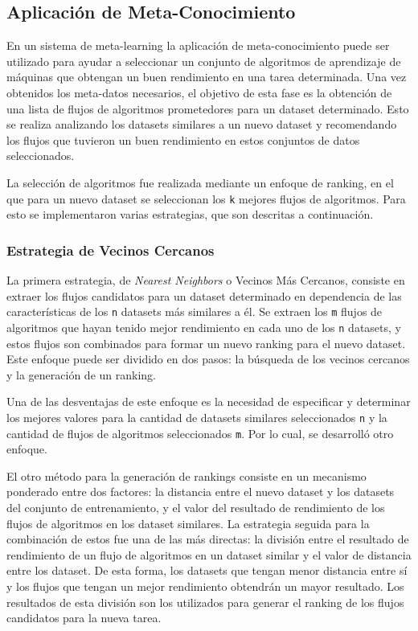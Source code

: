 \documentclass[a4paper,12pt]{article}
\begin{document}
	\subsection{Aplicación de Meta-Conocimiento}

En un sistema de meta-learning la aplicación de meta-conocimiento puede ser utilizado para ayudar a seleccionar un conjunto de algoritmos de aprendizaje de máquinas que obtengan un buen rendimiento en una tarea determinada. Una vez obtenidos los meta-datos necesarios, el objetivo de esta fase es la obtención de una lista de flujos de algoritmos prometedores para un dataset determinado. Esto se realiza analizando los datasets similares a un nuevo dataset y recomendando los flujos que tuvieron un buen rendimiento en estos conjuntos de datos seleccionados. 

La selección de algoritmos fue realizada mediante un enfoque de ranking, en el que para un nuevo dataset se seleccionan los \texttt{k} mejores flujos de algoritmos. Para esto se implementaron varias estrategias, que son descritas a continuación.

	\subsubsection{Estrategia de Vecinos Cercanos}\label{subsub:nn}
	
	La primera estrategia, de \textit{Nearest Neighbors} o Vecinos Más Cercanos, consiste en extraer los flujos candidatos para un dataset determinado en dependencia de las características de los \texttt{n} datasets más similares a él. Se extraen los \texttt{m} flujos de algoritmos que hayan tenido mejor rendimiento en cada uno de los \texttt{n} datasets, y estos flujos son combinados para formar un nuevo ranking para el nuevo dataset. Este enfoque puede ser dividido en dos pasos: la búsqueda de los vecinos cercanos y la generación de un ranking.

	Una de las desventajas de este enfoque es la necesidad de especificar y determinar los mejores valores para la cantidad de datasets similares seleccionados \texttt{n} y la cantidad de flujos de algoritmos seleccionados \texttt{m}. Por lo cual, se desarrolló otro enfoque.

	El otro método para la generación de rankings consiste en un mecanismo ponderado entre dos factores: la distancia entre el nuevo dataset y los datasets del conjunto de entrenamiento, y el valor del resultado de rendimiento de los flujos de algoritmos en los dataset similares. La estrategia seguida para la combinación de estos fue una de las más directas: la división entre el resultado de rendimiento de un flujo de algoritmos en un dataset similar y el valor de distancia entre los dataset. De esta forma, los datasets que tengan menor distancia entre sí y los flujos que tengan un mejor rendimiento obtendrán un mayor resultado. Los resultados de esta división son los utilizados para generar el ranking de los flujos candidatos para la nueva tarea.
\end{document}
